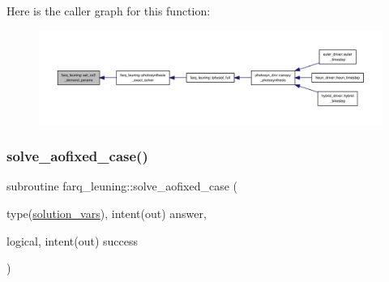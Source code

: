 Here is the caller graph for this function\+:
\nopagebreak
\begin{figure}[H]
\begin{center}
\leavevmode
\includegraphics[width=350pt]{namespacefarq__leuning_a7a8d111e1aa61a24fdbd7e96f67967e0_icgraph}
\end{center}
\end{figure}
\mbox{\label{namespacefarq__leuning_a8dbd2dbff6eba13ef68535d94a06a569}} 
\subsubsection{\texorpdfstring{solve\+\_\+aofixed\+\_\+case()}{solve\_aofixed\_case()}}
{\footnotesize\ttfamily subroutine farq\+\_\+leuning\+::solve\+\_\+aofixed\+\_\+case (\begin{DoxyParamCaption}\item[{type(\hyperlink{structc34constants_1_1solution__vars}{solution\+\_\+vars}), intent(out)}]{answer,  }\item[{logical, intent(out)}]{success }\end{DoxyParamCaption})}

